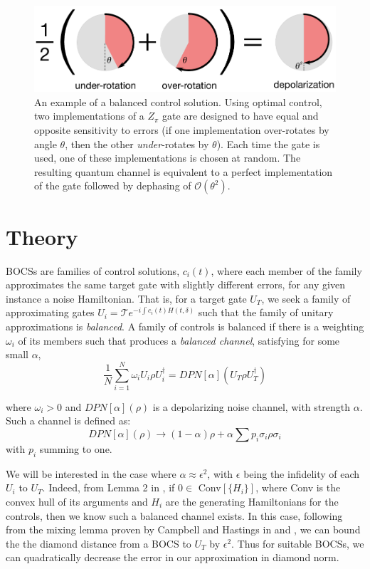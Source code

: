 \documentclass[aps,nofootinbib,pra,notitlepage,twocolumn]{revtex4-1}
\newcommand{\order}[1]{\mathcal{O}\left( #1 \right)}
\begin{document}
\begin{figure}
  \centering
  \includegraphics[width=\columnwidth]{simple_example.pdf}
  \caption{An example of a balanced control solution. Using optimal control, two implementations of a $Z_\pi$ gate are designed to have equal and opposite sensitivity to errors (if one implementation over-rotates by angle $\theta$, then the other \emph{under}-rotates by $\theta$). Each time the gate is used, one of these implementations is chosen at random. The resulting quantum channel is equivalent to a perfect implementation of the gate followed by dephasing of $\order{\theta^2}$.}
  \label{fig:simple_example}
\end{figure}

\section{Theory}
 BOCSs are families of control solutions, $c_i(t)$, where each member of the family approximates the same target gate with slightly different errors, for any given instance a noise Hamiltonian. That is, for a target gate $U_T$, we seek a family of approximating gates $U_i = \mathcal{T}e^{-i\int c_i(t)H(t, \delta)}$ such that the family of unitary approximations is \emph{balanced}. A family of controls is balanced if there is a weighting $\omega_i$ of its members such that produces a \textit{balanced channel}, satisfying for some small $\alpha$,
\begin{equation}\label{eq:1}
  \frac{1}{N}\sum_{i=1}^N \omega_i U_i \rho U_i^\dagger = DPN[\alpha]\left(U_T \rho U_T^\dagger \right)
\end{equation}

where $\omega_i > 0$ and $DPN[\alpha](\rho)$ is a depolarizing noise channel, with strength $\alpha$. Such a channel is defined as:
\begin{equation}\label{eq:2}
  DPN[\alpha](\rho) \rightarrow (1-\alpha)\rho + \alpha\sum p_i \sigma_i\rho\sigma_i
\end{equation}
with $p_i$ summing to one. 

We will be interested in the case where $\alpha \approx \epsilon^2$, with $\epsilon$ being the infidelity of each $U_i$ to $U_T$. Indeed, from Lemma 2 in \cite{Campbell2017}, if $0\in $ Conv$[\{H_i\}]$, where Conv is the convex hull of its arguments and $H_i$ are the generating Hamiltonians for the controls, then we know such a balanced channel exists. In this case, following from the mixing lemma proven by Campbell and Hastings in \cite{Campbell2017} and \cite{1612.01011}, we can bound the the diamond distance from a BOCS to $U_T$ by $\epsilon^2$. Thus for suitable BOCSs, we can quadratically decrease the error in our approximation in diamond norm. 
\end{document}
